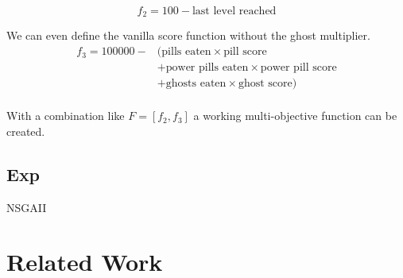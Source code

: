 \documentclass{llncs}
\begin{document}
\begin{equation}
f_2 = 100 - \text{last level reached}
\end{equation}

We can even define the vanilla score function without the ghost multiplier.
\begin{equation}
\begin{split}
f_3 = 100000 - & (\text{pills eaten} \times \text{pill score} \\
& + \text{power pills eaten} \times \text{power pill score} \\
& + \text{ghosts eaten} \times \text{ghost score}) \\
\end{split}
\end{equation}

With a combination like $F = [f_2, f_3]$ a working multi-objective function can be created.

\subsection{Exp}
NSGAII

%
\section{Related Work}
\label{sec:relatedWork}
%
\end{document}
